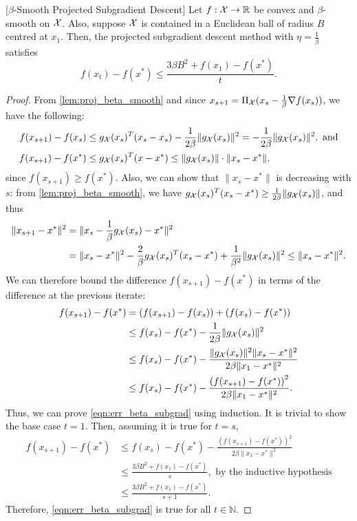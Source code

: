 \begin{theorem}\label{smooth_proj_gd}[$\beta$-Smooth Projected Subgradient Descent] Let $f : \mathcal{X} \rightarrow \mathbb{R}$ be convex and $\beta$-smooth on $\mathcal{X}$. Also, suppose $\mathcal{X}$ is contained in a Euclidean ball of radius $B$ centred at $x_1$. Then, the projected subgradient descent method with $\eta = \frac{1}{\beta}$ satisfies
\begin{equation} \label{eqn:err_beta_subgrad}
f(x_t) - f(x^*) \leq \frac{3 \beta B^2 + f(x_1) - f(x^*)}{t}.
\end{equation}
\begin{proof}
From \autoref{lem:proj_beta_smooth} and since $x_{s+1} = \Pi_{\mathcal{X}}(x_s - \frac{1}{\beta} \nabla f(x_s))$, we have the following:
\begin{align*}
f(x_{s+1}) - f(x_s) &\leq g_{\mathcal{X}}(x_s)^T(x_s - x_s) - \frac{1}{2 \beta} \| g_{\mathcal{X}}(x_s)\|^2 = - \frac{1}{2 \beta} \| g_{\mathcal{X}}(x_s)\|^2, \mbox{ and} \\
f(x_{s+1}) - f(x^*) &\leq g_{\mathcal{X}}(x_s)^T(x - x^*) \leq \|g_{\mathcal{X}}(x_s) \| \cdot \| x_s - x^* \|,
\end{align*}
since $f(x_{s+1}) \geq f(x^*)$. Also, we can show that $\|x_s - x^*\|$ is decreasing with $s$: from \autoref{lem:proj_beta_smooth}, we have $g_{\mathcal{X}}(x_s)^T(x_s - x^*) \geq \frac{1}{2\beta} \|g_{\mathcal{X}}(x_s)\|$, and thus
\begin{align*}
\|x_{s+1} - x^* \|^2 &= \|x_s - \frac{1}{\beta} g_{\mathcal{X}}(x_s) - x^*\|^2 \\
&= \|x_s - x^*\|^2 - \frac{2}{\beta}g_{\mathcal{X}}(x_s)^T(x_s - x^*) + \frac{1}{\beta^2}\|g_{\mathcal{X}}(x_s)\|^2 \leq \|x_s - x^*\|^2.
\end{align*}
We can therefore bound the difference $f(x_{s+1}) - f(x^*)$ in terms of the difference at the previous iterate:
\begin{align*}
f(x_{s+1}) - f(x^*) &= \left(f(x_{s+1}) - f(x_s)\right) + \left(f(x_s) - f(x^*)\right) \\
&\leq f(x_s) - f(x^*) - \frac{1}{2 \beta} \|g_{\mathcal{X}}(x_s)\|^2 \\
&\leq f(x_s) - f(x^*) - \frac{\|g_{\mathcal{X}}(x_s)\|^2 \|x_s - x^*\|^2}{2 \beta \|x_1 - x^*\|^2} \\
&\leq f(x_s) - f(x^*) - \frac{\left(f(x_{s+1}) - f(x^*)\right)^2}{2 \beta \|x_1 - x^*\|^2}.
\end{align*}
Thus, we can prove \eqref{eqn:err_beta_subgrad} using induction. It is trivial to show the base case $t=1$. Then, assuming it is true for $t = s$, 
\begin{align*}
f(x_{s+1}) - f(x^*) &\leq f(x_s) - f(x^*) - \frac{\left(f(x_{s+1}) - f(x^*)\right)^2}{2 \beta \|x_1 - x^*\|^2} \\
&\leq \frac{3 \beta B^2 + f(x_1) - f(x^*)}{s}, \mbox{ by the inductive hypothesis} \\
&\leq \frac{3 \beta B^2 + f(x_1) - f(x^*)}{s+1}.
\end{align*}
Therefore, \eqref{eqn:err_beta_subgrad} is true for all $t \in \mathbb{N}$. 
\end{proof}
\end{theorem}

